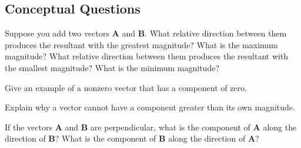 \documentclass[
]{book}
\newenvironment{conceptual-questions}{}{}
\begin{document}
\hypertarget{fs-id1611286}{}
\begin{conceptual-questions}

\hypertarget{conceptual-questions-8}{%
\subsection{Conceptual Questions}\label{conceptual-questions-8}}

\hypertarget{fs-id1611291}{}
\leavevmode\hypertarget{fs-id1611292}{}%
Suppose you add two vectors \(\mathbf{A}{}\) and \(\mathbf{B}{}\). What
relative direction between them produces the resultant with the greatest
magnitude? What is the maximum magnitude? What relative direction
between them produces the resultant with the smallest magnitude? What is
the minimum magnitude?

\hypertarget{fs-id1611340}{}
\leavevmode\hypertarget{fs-id1611341}{}%
Give an example of a nonzero vector that has a component of zero.

\hypertarget{fs-id1611347}{}
\leavevmode\hypertarget{fs-id1611348}{}%
Explain why a vector cannot have a component greater than its own
magnitude.

\hypertarget{fs-id1611354}{}
\leavevmode\hypertarget{fs-id1611356}{}%
If the vectors \(\mathbf{A}{}\) and \(\mathbf{B}{}\) are perpendicular, what
is the component of \(\mathbf{A}{}\) along the direction of
\(\mathbf{B}{}\)? What is the component of \(\mathbf{B}{}\) along the
direction of \(\mathbf{A}{}\)?

\end{conceptual-questions}
\end{document}
